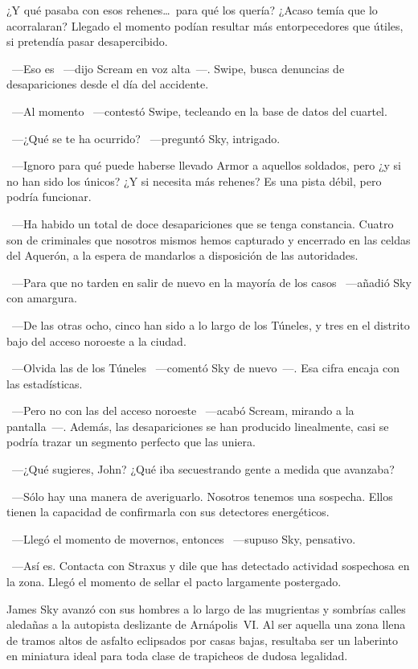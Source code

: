 ¿Y qué pasaba con esos rehenes\dots\ para qué los quería? ¿Acaso temía que lo acorralaran? Llegado el momento podían resultar más entorpecedores que útiles, si pretendía pasar desapercibido.

~---Eso es ~---dijo Scream en voz alta~---. Swipe, busca denuncias de desapariciones desde el día del accidente.

~---Al momento ~---contestó Swipe, tecleando en la base de datos del cuartel.

~---¿Qué se te ha ocurrido? ~---preguntó Sky, intrigado.

~---Ignoro para qué puede haberse llevado Armor a aquellos soldados, pero ¿y si no han sido los únicos? ¿Y si necesita más rehenes? Es una pista débil, pero podría funcionar.

~---Ha habido un total de doce desapariciones que se tenga constancia. Cuatro son de criminales que nosotros mismos hemos capturado y encerrado en las celdas del Aquerón, a la espera de mandarlos a disposición de las autoridades.

~---Para que no tarden en salir de nuevo en la mayoría de los casos ~---añadió Sky con amargura.

~---De las otras ocho, cinco han sido a lo largo de los Túneles, y tres en el distrito bajo del acceso noroeste a la ciudad.

~---Olvida las de los Túneles ~---comentó Sky de nuevo~---. Esa cifra encaja con las estadísticas.

~---Pero no con las del acceso noroeste ~---acabó Scream, mirando a la pantalla~---. Además, las desapariciones se han producido linealmente, casi se podría trazar un segmento perfecto que las uniera.

~---¿Qué sugieres, John? ¿Qué iba secuestrando gente a medida que avanzaba?

~---Sólo hay una manera de averiguarlo. Nosotros tenemos una sospecha. Ellos tienen la capacidad de confirmarla con sus detectores energéticos.

~---Llegó el momento de movernos, entonces ~---supuso Sky, pensativo.

~---Así es. Contacta con Straxus y dile que has detectado actividad sospechosa en la zona. Llegó el momento de sellar el pacto largamente postergado.

\bigskip\noindent
James Sky avanzó con sus hombres a lo largo de las mugrientas y sombrías calles aledañas a la autopista deslizante de Arnápolis~VI. Al ser aquella una zona llena de tramos altos de asfalto eclipsados por casas bajas, resultaba ser un laberinto en miniatura ideal para toda clase de trapicheos de dudosa legalidad.

